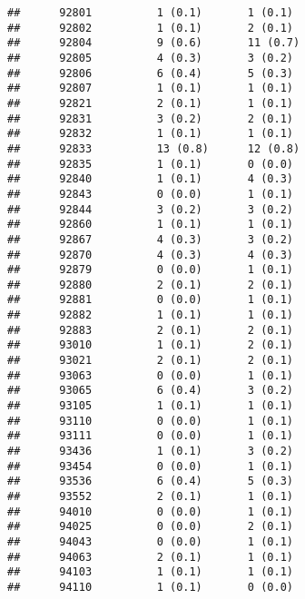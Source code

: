 \documentclass[]{article}
\begin{document}
\begin{verbatim}
##      92801          1 (0.1)       1 (0.1)                       
##      92802          1 (0.1)       2 (0.1)                       
##      92804          9 (0.6)       11 (0.7)                      
##      92805          4 (0.3)       3 (0.2)                       
##      92806          6 (0.4)       5 (0.3)                       
##      92807          1 (0.1)       1 (0.1)                       
##      92821          2 (0.1)       1 (0.1)                       
##      92831          3 (0.2)       2 (0.1)                       
##      92832          1 (0.1)       1 (0.1)                       
##      92833          13 (0.8)      12 (0.8)                      
##      92835          1 (0.1)       0 (0.0)                       
##      92840          1 (0.1)       4 (0.3)                       
##      92843          0 (0.0)       1 (0.1)                       
##      92844          3 (0.2)       3 (0.2)                       
##      92860          1 (0.1)       1 (0.1)                       
##      92867          4 (0.3)       3 (0.2)                       
##      92870          4 (0.3)       4 (0.3)                       
##      92879          0 (0.0)       1 (0.1)                       
##      92880          2 (0.1)       2 (0.1)                       
##      92881          0 (0.0)       1 (0.1)                       
##      92882          1 (0.1)       1 (0.1)                       
##      92883          2 (0.1)       2 (0.1)                       
##      93010          1 (0.1)       2 (0.1)                       
##      93021          2 (0.1)       2 (0.1)                       
##      93063          0 (0.0)       1 (0.1)                       
##      93065          6 (0.4)       3 (0.2)                       
##      93105          1 (0.1)       1 (0.1)                       
##      93110          0 (0.0)       1 (0.1)                       
##      93111          0 (0.0)       1 (0.1)                       
##      93436          1 (0.1)       3 (0.2)                       
##      93454          0 (0.0)       1 (0.1)                       
##      93536          6 (0.4)       5 (0.3)                       
##      93552          2 (0.1)       1 (0.1)                       
##      94010          0 (0.0)       1 (0.1)                       
##      94025          0 (0.0)       2 (0.1)                       
##      94043          0 (0.0)       1 (0.1)                       
##      94063          2 (0.1)       1 (0.1)                       
##      94103          1 (0.1)       1 (0.1)                       
##      94110          1 (0.1)       0 (0.0)                       

\end{verbatim}
\end{document}
